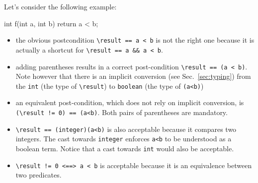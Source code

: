 

Let's consider the following example:
\begin{listing-nonumber}
  int f(int a, int b) { return a < b; }
\end{listing-nonumber}
\begin{itemize}
\item the obvious postcondition \lstinline[style=c]|\result == a < b|
  is not the right one because it is actually a shortcut for
  \lstinline[style=c]|\result == a && a < b|.
\item adding parentheses results in a correct post-condition
  \lstinline[style=c]|\result == (a < b)|. Note however that there is an implicit
  conversion (see Sec.~\ref{sec:typing})
  from the \lstinline[style=c]|int| (the type of \lstinline[style=c]|\result|) to
  \lstinline[style=c]|boolean| (the type of \lstinline[style=c]|(a<b)|)
\item an equivalent post-condition, which does not rely on implicit
  conversion, is \lstinline[style=c]|(\result != 0) == (a<b)|. Both pairs of
  parentheses are mandatory.
\item \lstinline[style=c]|\result == (integer)(a<b)| is also acceptable because it compares
  two integers. The cast towards \lstinline[style=c]|integer| enforces
  \lstinline[style=c]|a<b| to be understood as a boolean term. Notice that a cast
  towards \lstinline[style=c]|int| would also be acceptable.
\item \lstinline[style=c]|\result != 0 <==> a < b| is acceptable because it is an
  equivalence between two predicates.
\end{itemize}

